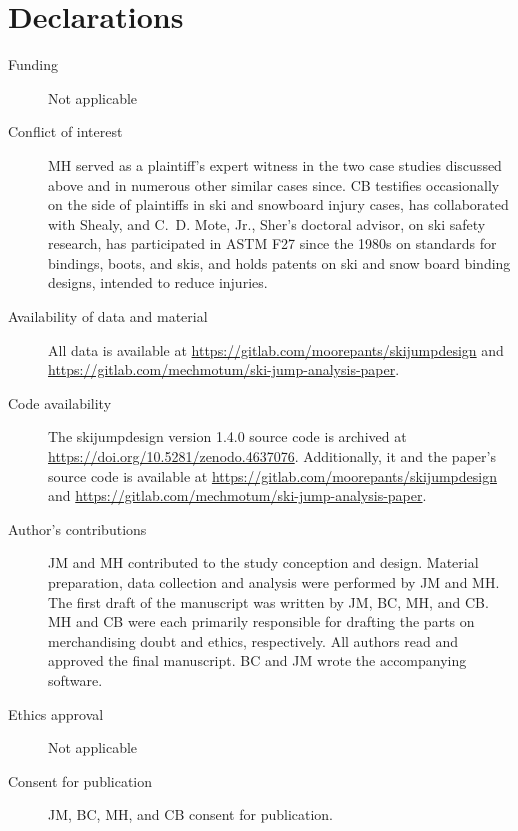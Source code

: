 \documentclass[smallextended]{svjour3}       %
\begin{document}
\section*{Declarations}
\begin{description}
  \item[Funding] Not applicable
  \item[Conflict of interest] MH served as a plaintiff's expert witness in the
    two case studies discussed above and in numerous other similar cases since.
    CB testifies occasionally on the side of plaintiffs in ski and snowboard
    injury cases, has collaborated with Shealy, and C.~D. Mote, Jr., Sher's
    doctoral advisor, on ski safety research, has participated in ASTM F27
    since the 1980s on standards for bindings, boots, and skis, and holds
    patents on ski and snow board binding designs, intended to reduce injuries.
  \item[Availability of data and material] All data is available at
    \url{https://gitlab.com/moorepants/skijumpdesign} and
    \url{https://gitlab.com/mechmotum/ski-jump-analysis-paper}.
  \item[Code availability] The skijumpdesign version 1.4.0 source code is
    archived at \url{https://doi.org/10.5281/zenodo.4637076}. Additionally, it
    and the paper's source code is available at
    \url{https://gitlab.com/moorepants/skijumpdesign} and
    \url{https://gitlab.com/mechmotum/ski-jump-analysis-paper}.
  \item[Author's contributions] JM and MH contributed to the study conception
    and design. Material preparation, data collection and analysis were
    performed by JM and MH. The first draft of the manuscript was written by
    JM, BC, MH, and CB. MH and CB were each primarily responsible for drafting
    the parts on merchandising doubt and ethics, respectively. All authors read
    and approved the final manuscript. BC and JM wrote the accompanying
    software.
  \item[Ethics approval] Not applicable
  \item[Consent for publication] JM, BC, MH, and CB consent for publication.
\end{description}


\end{document}
